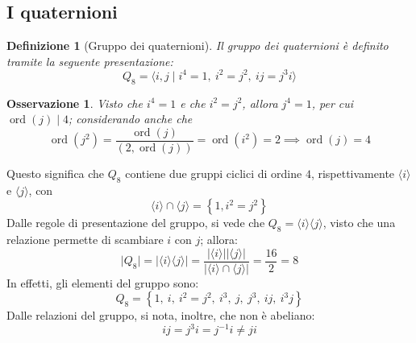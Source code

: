 \documentclass[11pt]{article}
\theoremstyle{style}
\newtheorem{definizione}{Definizione}[section]
\newtheorem{osservazione}{Osservazione}[section]
\numberwithin{equation}{subsection}
\begin{document}
\subsection{I quaternioni}
\begin{definizione}
	[Gruppo dei quaternioni]
Il gruppo dei quaternioni \`e definito tramite la seguente presentazione:
\begin{equation*}
	Q_8 = \langle i,j  \mid i^4 = 1 , \ i^2 = j^2 , \ ij = j^3 i  \rangle
\end{equation*}
\end{definizione}
\begin{osservazione}
Visto che $i^4 = 1$ e che $i^2 = j^2$, allora $j^4 = 1$, per cui $\operatorname{ord}(j)  \mid 4$; considerando anche che
\[
\operatorname{ord}(j^2) = \frac{\operatorname{ord}(j) }{(2,\operatorname{ord}(j) )} = \operatorname{ord}(i^2)  = 2 \implies \operatorname{ord}(j) = 4
\] 
\end{osservazione}
\noindent Questo significa che $Q_8$ contiene due gruppi ciclici di ordine $4$, rispettivamente $\langle i \rangle$ e $ \langle j \rangle$, con 
\[
\langle i \rangle\cap \langle j \rangle = \left\{ 1 , i^2 = j^2 \right\} 
\] 
Dalle regole di presentazione del gruppo, si vede che $Q_8 = \langle i \rangle\langle j \rangle$, visto che una relazione permette di scambiare $i$ con $j$; allora:
\[
\lvert Q_8 \rvert  = \lvert \langle i \rangle\langle j \rangle \rvert = \frac{\lvert \langle i \rangle \rvert \lvert \langle j \rangle \rvert }{\lvert \langle i \rangle\cap \langle j \rangle \rvert } = \frac{16}{2}=8
\] 
In effetti, gli elementi del gruppo sono:
\[
Q_8 = \left\{ 1 ,\ i ,\ i ^2 = j^2 ,\ i^3 ,\ j,\ j^3,\ ij,\ i^3j \right\} 
\] 
Dalle relazioni del gruppo, si nota, inoltre, che non \`e abeliano:
\[
ij = j^3 i = j^{-1}i\neq ji
\] 
\end{document}
